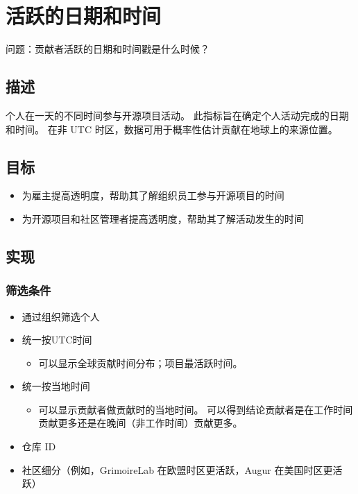 \hypertarget{ux6d3bux8dc3ux7684ux65e5ux671fux548cux65f6ux95f4}{%
\section{活跃的日期和时间}\label{ux6d3bux8dc3ux7684ux65e5ux671fux548cux65f6ux95f4}}

问题：贡献者活跃的日期和时间戳是什么时候？

\hypertarget{ux63cfux8ff0}{%
\subsection{描述}\label{ux63cfux8ff0}}

个人在一天的不同时间参与开源项目活动。
此指标旨在确定个人活动完成的日期和时间。 在非 UTC
时区，数据可用于概率性估计贡献在地球上的来源位置。

\hypertarget{ux76eeux6807}{%
\subsection{目标}\label{ux76eeux6807}}

\begin{itemize}
\tightlist
\item
  为雇主提高透明度，帮助其了解组织员工参与开源项目的时间
\item
  为开源项目和社区管理者提高透明度，帮助其了解活动发生的时间
\end{itemize}

\hypertarget{ux5b9eux73b0}{%
\subsection{实现}\label{ux5b9eux73b0}}

\hypertarget{ux7b5bux9009ux6761ux4ef6}{%
\subsubsection{筛选条件}\label{ux7b5bux9009ux6761ux4ef6}}

\begin{itemize}
\tightlist
\item
  通过组织筛选个人
\item
  统一按UTC时间

  \begin{itemize}
  \tightlist
  \item
    可以显示全球贡献时间分布；项目最活跃时间。
  \end{itemize}
\item
  统一按当地时间

  \begin{itemize}
  \tightlist
  \item
    可以显示贡献者做贡献时的当地时间。
    可以得到结论贡献者是在工作时间贡献更多还是在晚间（非工作时间）贡献更多。
  \end{itemize}
\item
  仓库 ID
\item
  社区细分（例如，GrimoireLab 在欧盟时区更活跃，Augur 在美国时区更活跃）
\end{itemize}

